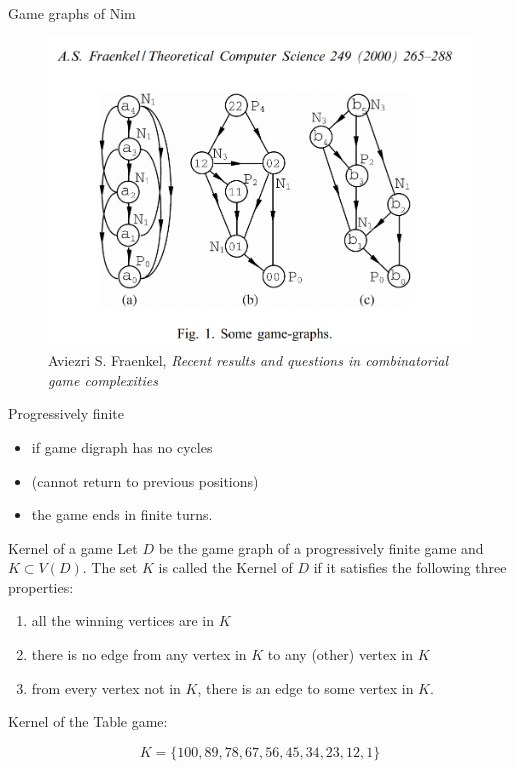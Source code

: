 \documentclass[compress]{beamer}
\newcommand{\blue}[1]{\textcolor{NordBlue}{#1}}
\newcommand{\red}[1]{\textcolor{NordRed}{#1}}
\begin{document}
\begin{frame}{Game graphs of Nim}
\begin{figure}
    \centering
    \includegraphics[width=0.75\framewidth]{img/game graphs.PNG}
    \caption{Aviezri S. Fraenkel, {\it Recent results and questions in combinatorial game complexities }}
    \label{fig:game_graphs}
\end{figure}
\end{frame}

\begin{frame}{Progressively finite}

\begin{itemize}
    \item if game digraph has \blue{no cycles}
    \item (cannot return to previous positions)
    \item the game \blue{ends} in \blue{finite} turns.
\end{itemize}

\end{frame}

\begin{frame}{Kernel of a game}
    Let $D$ be the game graph of a progressively finite game and $K \subset V(D)$. The set $K$ is called the \red{Kernel} of $D$ if it satisfies the following three
properties:

\bigskip
\begin{enumerate}
\item  all the winning vertices are in $K$
\item there is no edge from any vertex in $K$ to any (other) vertex in $K$
\item from every vertex not in $K$, there is an edge to some vertex in $K$.
\end{enumerate}
\bigskip
Kernel of the Table game:

\[ K = \{100, 89, 78, 67, 56, 45, 34, 23, 12, 1 \} \]
\end{frame}
\end{document}
